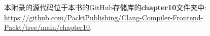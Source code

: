 本附录的源代码位于本书的GitHub存储库的\textbf{chapter10}文件夹中: \url{https://github.com/PacktPublishing/Clang-Compiler-Frontend-Packt/tree/main/chapter10}.
